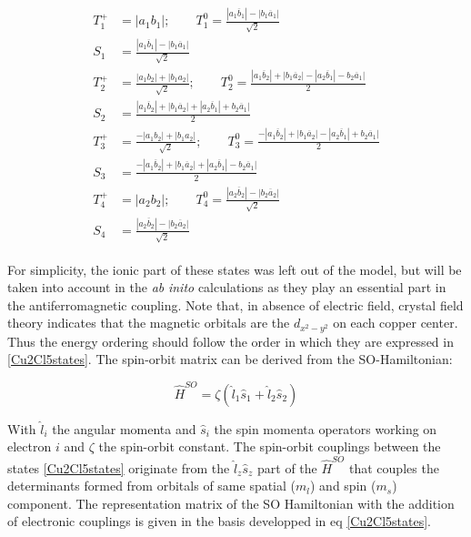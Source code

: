 \documentclass[12pt]{report}
\numberwithin{equation}{section}
\begin{document}
\begin{align}\label{Cu2Cl5states}
    \begin{split}
    T_1^+&=|a_1b_1| ; \qquad T_1^0= \frac{|a_1 \overline{b}_1|-|b_1\overline{a}_1|}{\sqrt{2}}\\
    S_1&=\frac{|a_1 \overline{b}_1|-|b_1\overline{a}_1|}{\sqrt{2}}\\
    T_2^+&=\frac{|a_1b_2|+|b_1a_2|}{\sqrt{2}} ;\qquad T_2^0=\frac{|a_1\overline{b}_2|+|b_1\overline{a}_2|-|a_2\overline{b}_1|-b_2\overline{a}_1|}{2}\\
    S_2&=\frac{|a_1\overline{b}_2|+|b_1\overline{a}_2|+|a_2\overline{b}_1|+b_2\overline{a}_1|}{2}\\
    T_3^+&=\frac{-|a_1b_2|+|b_1a_2|}{\sqrt{2}} ;\qquad T_3^0=\frac{-|a_1\overline{b}_2|+|b_1\overline{a}_2|-|a_2\overline{b}_1|+b_2\overline{a}_1|}{2}\\
    S_3&=\frac{-|a_1\overline{b}_2|+|b_1\overline{a}_2|+|a_2\overline{b}_1|-b_2\overline{a}_1|}{2}\\
    T_4^+&=|a_2b_2| ; \qquad T_4^0= \frac{|a_2 \overline{b}_2|-|b_2\overline{a}_2|}{\sqrt{2}}\\
    S_4&=\frac{|a_2 \overline{b}_2|-|b_2\overline{a}_2|}{\sqrt{2}} 
    \end{split}
\end{align}

For simplicity, the ionic part of these states was left out of the model, but will be taken into account in the \textit{ab} \textit{inito} calculations as they play an essential part in the antiferromagnetic coupling.
Note that, in absence of electric field, crystal field theory indicates that the magnetic orbitals are the $d_{x^2-y^2}$ on each copper center. Thus the energy ordering should follow the order in which they are expressed in \ref{Cu2Cl5states}.
The spin-orbit matrix can be derived from the SO-Hamiltonian:

\begin{equation}
    \hat{H}^{SO}=\zeta (\hat{l}_1 \hat{s}_1 +\hat{l}_2\hat{s}_2)
\end{equation}

With $\hat{l}_i$ the angular momenta and $\hat{s}_i$ the spin momenta operators working on electron $i$ and $\zeta$ the spin-orbit constant.
The spin-orbit couplings between the states \ref{Cu2Cl5states} originate from the $\hat{l}_z\hat{s}_z$ part of the $\hat{H}^{SO}$ that couples the determinants formed from orbitals of same spatial ($m_l$) and spin ($m_s$) component.
The representation matrix of the SO Hamiltonian with the addition of electronic couplings is given in the basis developped in eq \ref{Cu2Cl5states}.
\end{document}
